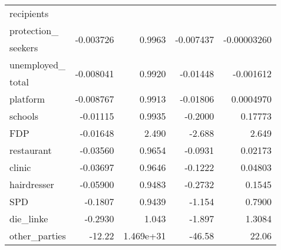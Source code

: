 \begin{table}[H]
\begin{tabular}{l r r r r}
recipients \\
protection\_ & \multirow{2}{*}{-0.003726} & \multirow{2}{*}{0.9963}  & \multirow{2}{*}{-0.007437} & \multirow{2}{*}{-0.00003260}\\
seekers \\
unemployed\_ & \multirow{2}{*}{-0.008041} & \multirow{2}{*}{0.9920}  & \multirow{2}{*}{-0.01448} & \multirow{2}{*}{-0.001612} \\
total \\
platform & -0.008767  & 0.9913 &  -0.01806 & 0.0004970 \\
schools & -0.01115  & 0.9935 & -0.2000 & 0.17773 \\
FDP & -0.01648  & 2.490 & -2.688 & 2.649 \\
restaurant & -0.03560  & 0.9654 &  -0.0931 & 0.02173 \\
clinic & -0.03697  & 0.9646 &  -0.1222 & 0.04803 \\
hairdresser & -0.05900  & 0.9483 & -0.2732 & 0.1545 \\
SPD & -0.1807  & 0.9439 &  -1.154 & 0.7900 \\
die\_linke & -0.2930  & 1.043 &  -1.897 & 1.3084 \\
other\_parties & -12.22  & 1.469e+31 & -46.58 & 22.06 \\
\bottomrule
\end{tabular}
\end{table}